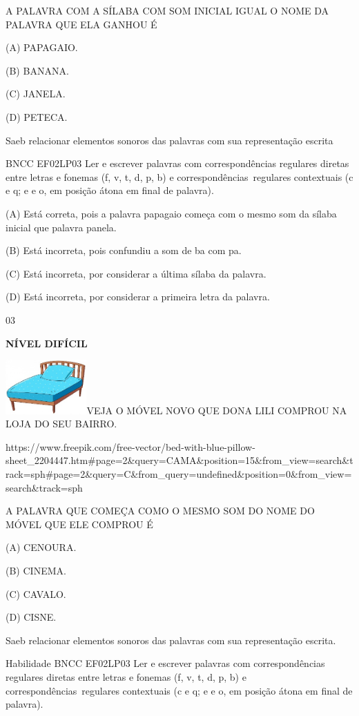 {{\protect\hypertarget{_Hlk129268378}{}{}A PALAVRA COM A SÍLABA COM SOM
INICIAL IGUAL O NOME DA PALAVRA QUE ELA GANHOU É

(A) PAPAGAIO.

(B) BANANA.

(C) JANELA.

(D) PETECA.

Saeb relacionar elementos sonoros das palavras com sua representação
escrita

BNCC EF02LP03 Ler e escrever palavras com correspondências regulares
diretas entre letras e fonemas (f, v, t, d, p, b) e
correspondências~regulares contextuais (c e q; e e o, em posição átona
em final de palavra).

(A) Está correta, pois a palavra papagaio começa com o mesmo som da
sílaba inicial que palavra panela.

(B) Está incorreta, pois confundiu a som de ba com pa.

(C) Está incorreta, por considerar a última sílaba da palavra.

(D) Está incorreta, por considerar a primeira letra da palavra.

\num{03}

\textbf{NÍVEL DIFÍCIL}

\includegraphics[width=1.22293in,height=0.81839in]{media/image140.jpeg}VEJA
O MÓVEL NOVO QUE DONA LILI COMPROU NA LOJA DO SEU BAIRRO.

https://www.freepik.com/free-vector/bed-with-blue-pillow-sheet\_2204447.htm\#page=2\&query=CAMA\&position=15\&from\_view=search\&track=sph\#page=2\&query=C\&from\_query=undefined\&position=0\&from\_view=search\&track=sph

\protect\hypertarget{_Hlk129272831}{}{}A PALAVRA QUE COMEÇA COMO O MESMO
SOM DO NOME DO MÓVEL QUE ELE COMPROU É

(A) CENOURA.

(B) CINEMA.

(C) CAVALO.

(D) CISNE.

\protect\hypertarget{_Hlk129152414}{}{\protect\hypertarget{_Hlk129151771}{}{}}Saeb
relacionar elementos sonoros das palavras com sua representação escrita.

Habilidade BNCC EF02LP03 Ler e escrever palavras com correspondências
regulares diretas entre letras e fonemas (f, v, t, d, p, b) e
correspondências~regulares contextuais (c e q; e e o, em posição átona
em final de palavra).

}}
